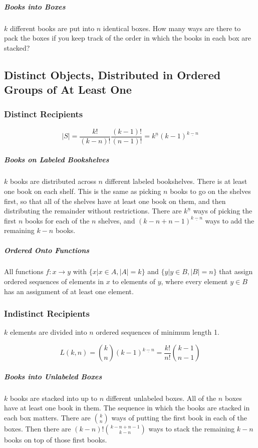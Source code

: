 \subparagraph{Books into Boxes} $k$ different books are put into $n$ identical boxes. How many ways are there to pack the boxes if you keep track of the order in which the books in each box are stacked? 


\subsection{Distinct Objects, Distributed in Ordered Groups of At Least One}

\subsubsection{Distinct Recipients}

\begin{equation}
|S| = \frac{k!}{(k-n)!}\frac{(k-1)!}{(n-1)!} = k^{\underline{n}} (k-1)^{\underline{k-n}}
\end{equation}

\subparagraph{Books on Labeled Bookshelves} $k$ books are distributed across $n$ different labeled bookshelves. There is at least one book on each shelf. This is the same as picking $n$ books to go on the shelves first, so that all of the shelves have at least one book on them, and then distributing the remainder without restrictions. There are $k^{\underline{n}}$ ways of picking the first $n$ books for each of the $n$ shelves, and $(k-n+n-1)^{\underline{k-n}}$ ways to add the remaining $k-n$ books. 

\subparagraph{Ordered Onto Functions} All functions $f: x \rightarrow y$ with $\{x | x\in A, |A| = k \}$ and $\{y | y\in B, |B| = n\}$ that assign ordered sequences of elements in $x$ to elements of $y$, where every element $y\in B$ has an assignment of at least one element.

\subsubsection{Indistinct Recipients}
$k$ elements are divided into $n$ ordered sequences of minimum length 1.

\begin{equation}
L(k,n)= {k \choose n} (k-1)^{\underline{k-n}} = \frac{k!}{n!}{ k-1 \choose n-1 }
\end{equation}
	
\subparagraph{Books into Unlabeled Boxes} $k$ books are stacked into up to $n$ different unlabeled boxes. All of the $n$ boxes have at least one book in them. The sequence in which the books are stacked in each box matters. There are ${k \choose n}$ ways of putting the first book in each of the boxes. Then there are $(k-n)!{k-n+n-1 \choose k-n}$ ways to stack the remaining $k-n$ books on top of those first books. 

